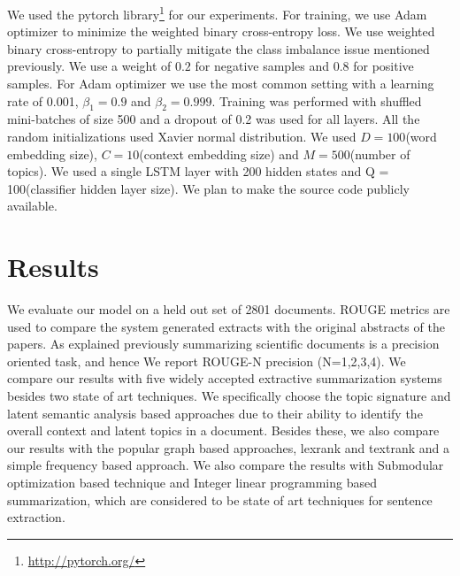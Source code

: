 We used the pytorch library\footnote{\url{http://pytorch.org/}} for our experiments. For training, we use Adam optimizer to minimize the weighted binary cross-entropy loss. We use weighted binary cross-entropy to partially mitigate the class imbalance issue mentioned previously. We use a weight of $0.2$ for negative samples and $0.8$ for positive samples. For Adam optimizer we use the most common setting with a learning rate of 0.001, $\beta_1 = 0.9$ and $\beta_2=0.999$. Training was performed with shuffled mini-batches of size 500 and a dropout of 0.2 was used for all layers. All the random initializations used Xavier normal distribution. We used $D = 100$(word embedding size), $C = 10$(context embedding size) and $M = 500$(number of topics). We used a single LSTM layer with 200 hidden states and Q = 100(classifier hidden layer size). We plan to make the source code publicly available.
 
\section{Results}

We evaluate our model on a held out set of 2801 documents. ROUGE metrics\cite{lin2004rouge} are used to compare the system generated extracts with the original abstracts of the papers. As explained previously summarizing scientific documents is a precision oriented task, and hence We report ROUGE-N precision (N=1,2,3,4). We compare our results with five widely accepted extractive summarization systems besides two state of art techniques. We specifically choose the topic signature\cite{lin2000automated} and latent semantic analysis\cite{steinberger2004using} based approaches due to their ability to identify the overall context and latent topics in a document. Besides these, we also compare our results with the popular graph based approaches, lexrank\cite{erkan2004lexrank} and textrank\cite{mihalcea2004textrank} and a simple frequency based approach. We also compare the results with Submodular optimization based technique\cite{lin2012learning} and Integer linear programming based summarization\cite{gillick2009scalable}, which are considered to be state of art techniques for sentence extraction\cite{hong2014repository}.\\

